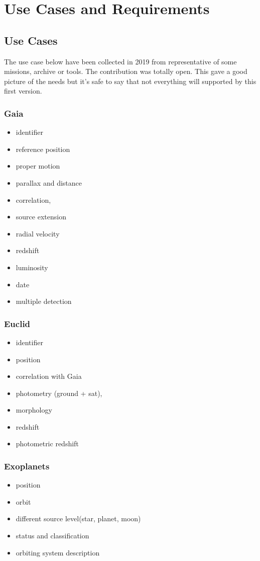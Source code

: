 \documentclass[11pt,a4paper]{ivoa}
\begin{document}
\section{Use Cases and  Requirements}

\subsection{Use Cases}
The use case below have been collected in 2019 from representative of some missions, archive or tools. The contribution was totally open. This gave a good picture of the needs but it's safe to say that not everything will supported by this first version.

\subsubsection{Gaia}
\begin{itemize}
    \item identifier
    \item reference position
    \item proper motion
    \item parallax and distance
    \item correlation,
    \item source extension
    \item radial velocity
    \item redshift
    \item luminosity
    \item date
    \item multiple detection
\end{itemize}


\subsubsection{Euclid}
\begin{itemize}    
    \item identifier
    \item position
    \item correlation with Gaia
    \item photometry (ground + sat),
    \item morphology
    \item redshift
    \item photometric redshift
\end{itemize}

\subsubsection{Exoplanets}
\begin{itemize}
    \item position
    \item orbit
    \item different source level(star, planet, moon)
    \item status and classification
    \item orbiting system description
\end{itemize}
\end{document}
